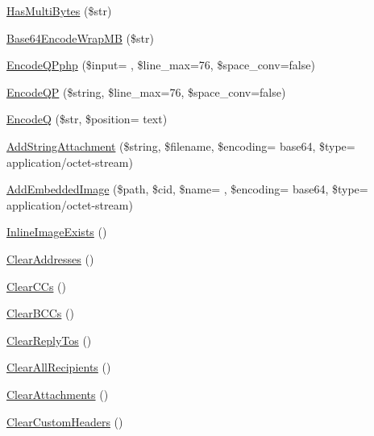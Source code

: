 \begin{DoxyCompactItemize}
\item 
\hyperlink{class_p_h_p_mailer_ae3d2298350cc0fca4808efa8253d6da4}{Has\+Multi\+Bytes} (\$str)
\item 
\hyperlink{class_p_h_p_mailer_a634435103a92ef0aa4d3cf80b4180eea}{Base64\+Encode\+Wrap\+M\+B} (\$str)
\item 
\hyperlink{class_p_h_p_mailer_a44098f7078182d720bf6399f6f39d697}{Encode\+Q\+Pphp} (\$input= \textquotesingle{}\textquotesingle{}, \$line\+\_\+max=76, \$space\+\_\+conv=false)
\item 
\hyperlink{class_p_h_p_mailer_a58bd3981353babf8d5ba4d78c5404988}{Encode\+Q\+P} (\$string, \$line\+\_\+max=76, \$space\+\_\+conv=false)
\item 
\hyperlink{class_p_h_p_mailer_a18b6618dc769030b41011c32671c19af}{Encode\+Q} (\$str, \$position= \textquotesingle{}text\textquotesingle{})
\item 
\hyperlink{class_p_h_p_mailer_a1c05cb767bed1f2fc54213e8565a0849}{Add\+String\+Attachment} (\$string, \$filename, \$encoding= \textquotesingle{}base64\textquotesingle{}, \$type= \textquotesingle{}application/octet-\/stream\textquotesingle{})
\item 
\hyperlink{class_p_h_p_mailer_a48d4fc8acd54a1137de3d63ef330ef6a}{Add\+Embedded\+Image} (\$path, \$cid, \$name= \textquotesingle{}\textquotesingle{}, \$encoding= \textquotesingle{}base64\textquotesingle{}, \$type= \textquotesingle{}application/octet-\/stream\textquotesingle{})
\item 
\hyperlink{class_p_h_p_mailer_ad9675f5662e8438d471798bb66dac4be}{Inline\+Image\+Exists} ()
\item 
\hyperlink{class_p_h_p_mailer_ae8518ce87326e5efdfb045bbca389d1d}{Clear\+Addresses} ()
\item 
\hyperlink{class_p_h_p_mailer_a1e29b216406bbf72e16d3dd7b563d905}{Clear\+C\+Cs} ()
\item 
\hyperlink{class_p_h_p_mailer_a3a3de80643c197db7652de6ce6bf5eb9}{Clear\+B\+C\+Cs} ()
\item 
\hyperlink{class_p_h_p_mailer_a899a2ba35537f2c4700ed985351e415f}{Clear\+Reply\+Tos} ()
\item 
\hyperlink{class_p_h_p_mailer_a4dc685f3211d10891cb5230dd5ebc70c}{Clear\+All\+Recipients} ()
\item 
\hyperlink{class_p_h_p_mailer_a5f5fed55c3065b3978459f1de78dea59}{Clear\+Attachments} ()
\item 
\hyperlink{class_p_h_p_mailer_aa30deb04f3ad35ed89baa64a2e37e7bb}{Clear\+Custom\+Headers} ()
\item 

\end{DoxyCompactItemize}
